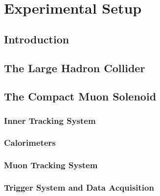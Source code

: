 
\chapter{Experimental Setup}

\section{Introduction}

\section{The Large Hadron Collider}

\section{The Compact Muon Solenoid}

\subsection{Inner Tracking System}

\subsection{Calorimeters}

\subsection{Muon Tracking System}

\subsection{Trigger System and Data Acquisition}

